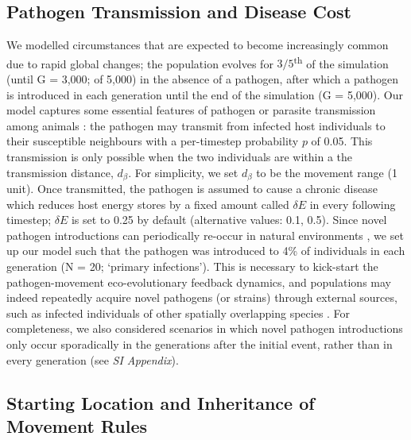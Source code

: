\subsection*{Pathogen Transmission and Disease Cost}

We modelled circumstances that are expected to become increasingly common due to rapid global changes; the population evolves for $3/5$\textsuperscript{th} of the simulation (until G = 3,000; of 5,000) in the absence of a pathogen, after which a pathogen is introduced in each generation until the end of the simulation (G = 5,000).
Our model captures some essential features of pathogen or parasite transmission among animals \autocite{white2017}: the pathogen may transmit from infected host individuals to their susceptible neighbours with a per-timestep probability $p$ of 0.05.
This transmission is only possible when the two individuals are within a the transmission distance, $d_\beta$.
For simplicity, we set $d_\beta$ to be the movement range (1 unit).
Once transmitted, the pathogen is assumed to cause a chronic disease which reduces host energy stores by a fixed amount called $\delta E$ in every following timestep; $\delta E$ is set to 0.25 by default (alternative values: 0.1, 0.5).
Since novel pathogen introductions can periodically re-occur in natural environments \autocite{jolles2021,bastos2000,vosloo2009,almberg2015,goulson2015,wille2022,carlson2022a}, we set up our model such that the pathogen was introduced to 4\% of individuals in each generation (N = 20; `primary infections').
This is necessary to kick-start the pathogen-movement eco-evolutionary feedback dynamics, and populations may indeed repeatedly acquire novel pathogens (or strains) through external sources, such as infected individuals of other spatially overlapping species \autocite[e.g.][]{kuchipudi2022,wille2022,chandler2021,vosloo2009,bastos2000,monk2022,keeling2001,carlson2022a}.
For completeness, we also considered scenarios in which novel pathogen introductions only occur sporadically in the generations after the initial event, rather than in every generation (see \emph{SI Appendix}).

\subsection*{Starting Location and Inheritance of Movement Rules}

